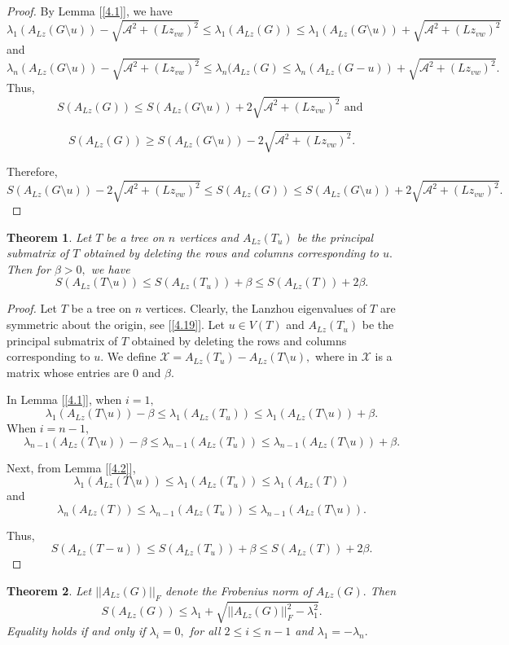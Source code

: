 \documentclass[10pt,a4paper,oneside]{article}
\newtheorem{theorem}{Theorem}
\begin{document}
\begin{proof}
	
	By Lemma [\ref{4.1}], we have $$\lambda_1(A_{Lz}(G\setminus u))-\sqrt{\mathcal{A}^2+(Lz_{vw})^2}\leq \lambda_1(A_{Lz}(G))\leq \lambda_1(A_{Lz}(G\setminus u))+\sqrt{\mathcal{A}^2+(Lz_{vw})^2}$$ and  
	$$\lambda_n(A_{Lz}(G\setminus u))-\sqrt{\mathcal{A}^2+(Lz_{vw})^2}\leq \lambda_n(A_{Lz}(G)\leq \lambda_n(A_{Lz}(G-u))+\sqrt{\mathcal{A}^2+(Lz_{vw})^2}.$$
	Thus, $$S(A_{Lz}(G))\leq S(A_{Lz}(G\setminus u))+2\sqrt{\mathcal{A}^2+(Lz_{vw})^2}\text{\ and }$$ 
	
	$$S(A_{Lz}(G))\geq S(A_{Lz}(G\setminus u))-2\sqrt{\mathcal{A}^2+(Lz_{vw})^2}.$$
	
	
	Therefore, $$S(A_{Lz}(G\setminus u))-2\sqrt{\mathcal{A}^2+(Lz_{vw})^2}\leq S(A_{Lz}(G))\leq S(A_{Lz}(G\setminus u))+2\sqrt{\mathcal{A}^2+(Lz_{vw})^2}.$$
\end{proof}
\begin{theorem}
	Let $T$ be a tree on $n$ vertices and $A_{Lz}(T_u)$ be the principal submatrix of $T$ obtained by deleting the rows and columns corresponding to $u.$ Then for $\beta>0,$ we have
	$$S(A_{Lz}(T\setminus u))\leq S(A_{Lz}(T_u))+\beta\leq S(A_{Lz}(T))+2\beta.$$
\end{theorem}
\begin{proof}
Let $T$ be a tree on $n$ vertices. Clearly, the Lanzhou eigenvalues of $T$ are symmetric about the origin, see [\ref{4.19}]. Let $u\in V(T)$ and $A_{Lz}(T_u)$ be the principal submatrix of $T$ obtained by deleting the rows and columns corresponding to $u.$ We define $\mathcal{X}=A_{Lz}(T_u)-A_{Lz}(T\setminus u),$ where in $\mathcal{X}$ is a matrix whose entries are $0$ and $\beta.$ 
	

In Lemma [\ref{4.1}], when $i=1,$ 
$$\lambda_1(A_{Lz}(T\setminus u))-\beta\leq \lambda_1(A_{Lz}(T_u))\leq \lambda_1(A_{Lz}(T\setminus u))+\beta.$$
When $i=n-1,$  $$\lambda_{n-1}(A_{Lz}(T\setminus u))-\beta\leq \lambda_{n-1}(A_{Lz}(T_u))\leq \lambda_{n-1}(A_{Lz}(T\setminus u))+\beta.$$
	

Next, from Lemma [\ref{4.2}], $$\lambda_1(A_{Lz}(T\setminus u))\leq \lambda_1(A_{Lz}(T_u))\leq \lambda_1(A_{Lz}(T))$$ and $$\lambda_n(A_{Lz}(T))\leq \lambda_{n-1}(A_{Lz}(T_u))\leq \lambda_{n-1}(A_{Lz}(T\setminus u)).$$
	

Thus, $$S(A_{Lz}(T-u))\leq S(A_{Lz}(T_u))+\beta\leq S(A_{Lz}(T))+2\beta.$$
\end{proof}
\begin{theorem}
Let $\vert\vert A_{Lz}(G)\vert \vert_F$ denote the Frobenius norm of $A_{Lz}(G).$ Then 
$$S(A_{Lz}(G))\leq \lambda_1+\sqrt{\vert\vert A_{Lz}(G)\vert \vert_F^2-\lambda_1^2}.$$ Equality holds if and only if $\lambda_i=0,$ for all $2\leq i\leq n-1$ and $\lambda_1=-\lambda_n.$
\end{theorem}
\end{document}
